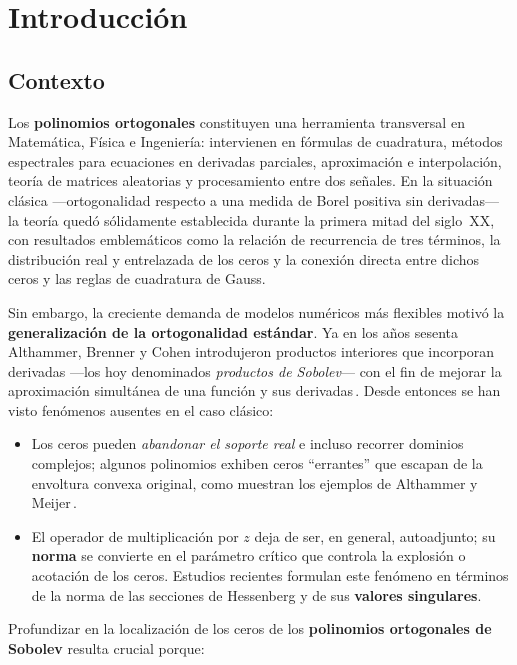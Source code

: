 \chapter{Introducción}
\label{ch:intro}

\section{Contexto}

Los \textbf{polinomios ortogonales} constituyen una herramienta transversal en Matemática, Física e Ingeniería: intervienen en fórmulas de cuadratura, métodos espectrales para ecuaciones en derivadas parciales, aproximación e interpolación, teoría de matrices aleatorias y procesamiento entre dos señales.
En la situación clásica —ortogonalidad respecto a una medida de Borel positiva sin derivadas— la teoría quedó sólidamente establecida durante la primera mitad del siglo~XX, con resultados emblemáticos como la relación de recurrencia de tres términos, la distribución real y entrelazada de los ceros y la conexión directa entre dichos ceros y las reglas de cuadratura de Gauss.

Sin embargo, la creciente demanda de modelos numéricos más flexibles motivó la \textbf{generalización de la ortogonalidad estándar}.  Ya en los años sesenta Althammer, Brenner y Cohen introdujeron productos interiores que incorporan derivadas —los hoy denominados \emph{productos de Sobolev}— con el fin de mejorar la aproximación simultánea de una función y sus derivadas\,\cite{Althammer1962,Brenner1972,Cohen1975}.
Desde entonces se han visto fenómenos ausentes en el caso clásico:

\begin{itemize}
	\item Los ceros pueden \emph{abandonar el soporte real} e incluso recorrer dominios complejos; algunos polinomios exhiben ceros ``errantes'' que escapan de la envoltura convexa original, como muestran los ejemplos de Althammer y Meijer\,\cite{Meijer1993,Meijer1994}.
	\item El operador de multiplicación por $z$ deja de ser, en general, autoadjunto; su \textbf{norma} se convierte en el parámetro crítico que controla la explosión o acotación de los ceros.  Estudios recientes formulan este fenómeno en términos de la norma de las secciones de Hessenberg y de sus \textbf{valores singulares}\cite{singularValuesOfHessenbergMatrices}.
\end{itemize}

Profundizar en la localización de los ceros de los \textbf{polinomios ortogonales de Sobolev} resulta crucial porque:

